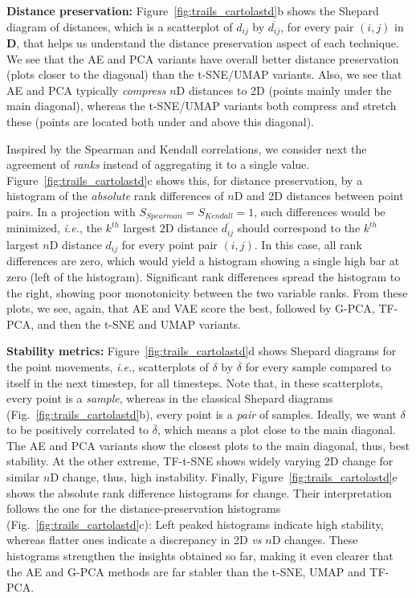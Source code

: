 \noindent\textbf{Distance preservation:} Figure~\ref{fig:trails_cartolastd}b shows the Shepard diagram of distances, which is a scatterplot of $d_{ij}$ by $\overline{d_{ij}}$, for every pair $(i,j)$ in $\mathbf{D}$, that helps us understand the distance preservation aspect of each technique. We see that the AE and PCA variants have overall better distance preservation (plots closer to the diagonal) than the t-SNE/UMAP variants. Also, we see that AE and PCA typically \emph{compress} $n$D distances to 2D (points mainly under the main diagonal), whereas the t-SNE/UMAP variants both compress and stretch these (points are located both under and above this diagonal).

Inspired by the Spearman and Kendall correlations, we consider next the agreement of \emph{ranks} instead of aggregating it to a single value. Figure~\ref{fig:trails_cartolastd}c shows this, for distance preservation, by a histogram of the \emph{absolute} rank differences of $n$D and 2D distances between point pairs. In a projection with $S_{Spearman} = S_{Kendall} = 1$, such differences would be minimized, \emph{i.e.}, the $k^{th}$ largest 2D distance $\overline{d_{ij}}$ should correspond to the $k^{th}$ largest $n$D distance $d_{ij}$ for every point pair $(i,j)$. In this case, all rank differences are zero, which would yield a histogram showing a single high bar at zero (left of the histogram). Significant rank differences spread the histogram to the right, showing poor monotonicity between the two variable ranks. From these plots, we see, again, that AE and VAE score the best, followed by G-PCA, TF-PCA, and then the t-SNE and UMAP variants.

\noindent\textbf{Stability metrics:} Figure~\ref{fig:trails_cartolastd}d shows Shepard diagrams for the point movements, \emph{i.e.}, scatterplots of $\delta$ by $\overline{\delta}$ for every sample compared to itself in the next timestep, for all timesteps. Note that, in these scatterplots, every point is a \emph{sample}, whereas in the classical Shepard diagrams (Fig.~\ref{fig:trails_cartolastd}b), every point is a \emph{pair} of samples. Ideally, we want $\delta$ to be positively correlated to $\overline{\delta}$, which means a plot close to the main diagonal.
The AE and PCA variants show the closest plots to the main diagonal, thus, best stability. At the other extreme, TF-t-SNE shows widely varying 2D change for similar $n$D change, thus, high instability. Finally, Figure~\ref{fig:trails_cartolastd}e shows the absolute rank difference histograms for change. Their interpretation follows the one for the distance-preservation histograms (Fig.~\ref{fig:trails_cartolastd}c):
Left peaked histograms indicate high stability, whereas flatter ones indicate a discrepancy in 2D \emph{vs} $n$D changes. These histograms strengthen the insights obtained so far, making it even clearer that the AE and G-PCA methods are far stabler than the t-SNE, UMAP and TF-PCA.



